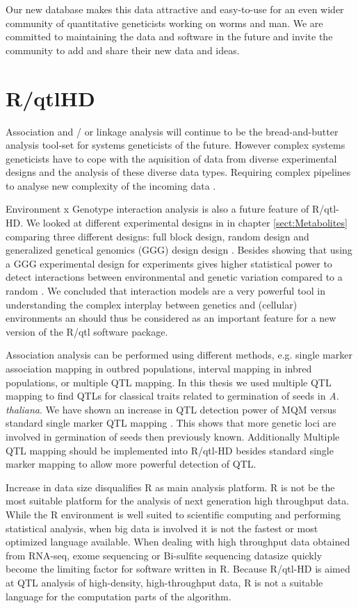 Our new database makes this data attractive and easy-to-use for an even wider community of 
quantitative geneticists working on worms and man. We are committed to maintaining the data and 
software in the future and invite the community to add and share their new data and ideas. 

\section{R/qtlHD}
\label{sect:qtlHD}
Association and / or linkage analysis will continue to be the bread-and-butter analysis 
tool-set for systems geneticists of the future. However complex systems geneticists have 
to cope with the aquisition of data from diverse experimental designs and the analysis of 
these diverse data types. Requiring complex pipelines to analyse new complexity of the 
incoming data \cite{Trelles:2011}.

Environment x Genotype interaction analysis is also a future feature of R/qtl-HD. We looked at 
different experimental designs in in chapter \ref{sect:Metabolites} comparing three different 
designs: full block design, random design and generalized genetical genomics (GGG) design design 
\cite{Joosen:2013, Li:2009}. Besides showing that using a GGG experimental design for experiments 
gives higher statistical power to detect interactions between environmental and genetic variation 
compared to a random \cite{Joosen:2013}. We concluded that interaction models are a very powerful 
tool in understanding the complex interplay between genetics and (cellular) environments 
\cite{Joosen:2013} an should thus be considered as an important feature for a new version of the 
R/qtl software package.

Association analysis can be performed using different methods, e.g. single marker association 
mapping in outbred populations, interval mapping in inbred populations, or multiple QTL mapping. 
In this thesis we used multiple QTL mapping to find QTLs for classical traits related to 
germination of seeds in \emph{A. thaliana}. We have shown an increase in QTL detection power 
of MQM versus standard single marker QTL mapping \cite{Jansen:1994a, Joosen:2011}. This shows 
that more genetic loci are involved in germination of seeds then previously known. Additionally 
Multiple QTL mapping should be implemented into R/qtl-HD besides standard single marker mapping 
to allow more powerful detection of QTL.

Increase in data size disqualifies R as main analysis platform. R is  not be the most suitable 
platform for the analysis of next generation high throughput data. While the R environment is 
well suited to scientific computing and performing statistical analysis, when big data is involved 
it is not the fastest or most optimized language available. When dealing with high throughput 
data obtained from RNA-seq, exome sequencing or Bi-sulfite sequencing datasize quickly become 
the limiting factor for software written in R. Because R/qtl-HD is aimed at QTL analysis of 
high-density, high-throughput data, R is not a suitable language for the computation parts of 
the algorithm.

